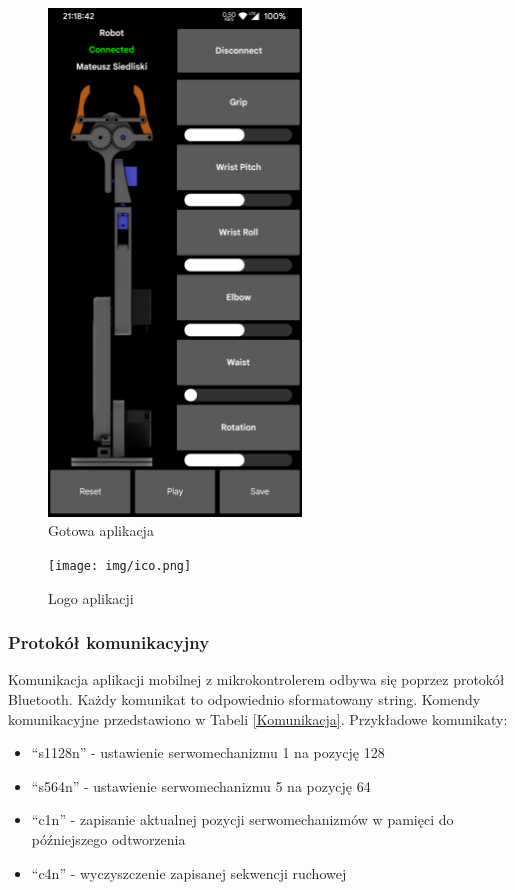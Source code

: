 \documentclass[11pt,titlepage]{article}
\begin{document}
\begin{figure}[p]
    \begin{center}
        \includegraphics[width=0.6\textwidth]{img/app.png}
    \end{center}
    \caption{Gotowa aplikacja}
    \label{FinalApp}
\end{figure}

\begin{figure}[p]
    \begin{center}
        \texttt{[image: img/ico.png]}
    \end{center}
    \caption{Logo aplikacji}
    \label{logoapp}
\end{figure}

\subsubsection{Protokół komunikacyjny}

Komunikacja aplikacji mobilnej z mikrokontrolerem odbywa się poprzez protokół Bluetooth. Każdy komunikat to odpowiednio sformatowany string. Komendy komunikacyjne przedstawiono w Tabeli \ref{Komunikacja}. Przykładowe komunikaty:
\begin{itemize}
    \item \enquote{s1128n} - ustawienie serwomechanizmu 1 na pozycję 128
    \item \enquote{s564n} - ustawienie serwomechanizmu 5 na pozycję 64
    \item \enquote{c1n} - zapisanie aktualnej pozycji serwomechanizmów w pamięci do późniejszego odtworzenia
    \item \enquote{c4n} - wyczyszczenie zapisanej sekwencji ruchowej
\end{itemize}
\end{document}
